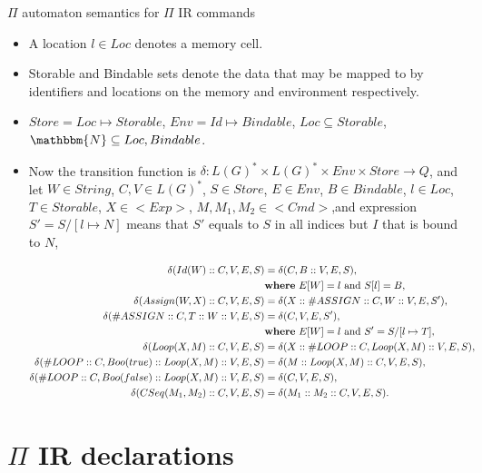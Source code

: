 \documentclass{beamer}
\begin{document}
\begin{frame}{{\color{red}$\Pi$ automaton} semantics for {\color{red}$\Pi$ IR} commands}
\begin{itemize}
\item A location $l \in Loc$ denotes a memory cell.
\item Storable and Bindable sets denote the data that may be mapped to by identifiers and locations on the memory and environment respectively. 
\item $Store = Loc \mapsto Storable$, $Env = Id \mapsto Bindable$, $Loc \subseteq Storable$, $\mathbbm{N} \subseteq Loc, Bindable$.
\item Now the transition function is $\delta : L(G)^* \times L(G)^* \times Env \times Store \to Q$, and let $W \in String$,  $C, V \in L(G)^*$, $S \in \mathit{Store}$, $E \in Env$, $B \in \mathit{Bindable}$, $l \in Loc$, $T \in \mathit{Storable}$, $X \in <Exp>$, $M, M_1, M_2 \in <Cmd>$,and expression $S' = S/[l \mapsto N]$ means that $S'$ equals to $S$ in all indices but $I$ that is bound to $N$,
\begin{tiny}
\begin{align}
\delta(Id(W) :: C, V, E, S) & = \delta(C, B :: V, E, S), \\ & \text{\bf where}~ E[W] = l ~\text{and}~ S[l] = B,\nonumber \\
%
\delta(Assign(W, X) :: C, V, E, S) & =  \delta(X :: \#ASSIGN :: C, W :: V, E, S'), \\
\delta(\#ASSIGN :: C, T :: W :: V, E, S) & = \delta(C, V, E, S'), & \\ & \text{\bf where}~ E[W] = l ~\text{and}~ S' = S/[l \mapsto T], \nonumber \\
%
\delta(Loop(X, M) :: C, V, E, S) & =  \delta(X :: \#LOOP :: C, Loop(X, M) :: V, E, S),  \\
\delta(\#LOOP :: C, Boo(true) :: Loop(X, M) :: V, E, S) & = \delta(M :: Loop(X, M) :: C, V, E, S),  \\
\delta(\#LOOP :: C, Boo(false) :: Loop(X, M) :: V, E, S) & = \delta(C, V, E, S), \\
%
\delta(CSeq(M_1, M_2) :: C, V, E, S) & = \delta(M_1 :: M_2 :: C, V, E, S).
\end{align}
\end{tiny}
\end{itemize}
\end{frame}

\section{$\Pi$ IR declarations}
\end{document}
